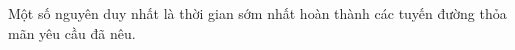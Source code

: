 Một số nguyên duy nhất là thời gian sớm nhất hoàn thành các tuyến đường thỏa mãn yêu cầu đã nêu.  

\
